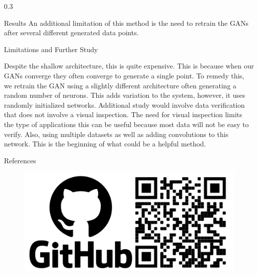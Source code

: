 \documentclass{msuposter}
\newcommand{\colwidth}{0.3\linewidth}
\begin{document}
\begin{frame}{}
\begin{columns}[t]
\begin{column}{\colwidth}
\begin{block}{Results}
An additional limitation of this method is the need to retrain the GANs after several different generated data points.
\end{block}


\begin{block}{Limitations and Further Study}

Despite the shallow architecture, this is quite expensive. This is because when our GANs converge they often converge to generate a single point. To remedy this, we retrain the GAN using a slightly different architecture often generating a random number of neurons. This adds variation to the system, however, it uses randomly initialized networks. Additional study would involve data verification that does not involve a visual inspection. The need for visual inspection limits the type of applications this can be useful because most data will not be easy to verify. Also, using multiple datasets as well as adding convolutions to this network. This is the beginning of what could be a helpful method. 

\end{block}


\begin{block}{References}
\scriptsize


\end{block}

\begin{figure}
  \includegraphics[]{github.png}
\end{figure}

\end{column}

\end{columns}
	\end{frame}
\end{document}

